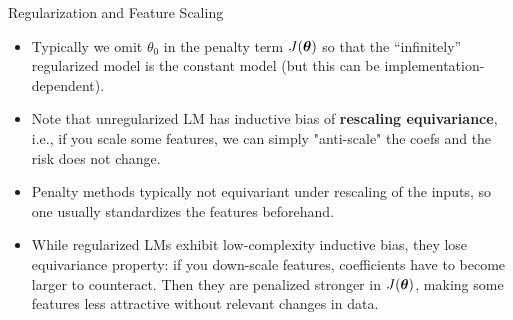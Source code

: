 \documentclass[11pt,compress,t,notes=noshow, xcolor=table]{beamer}
\begin{document}
\begin{vbframe}{Regularization and Feature Scaling}

  \begin{itemize}
    \item Typically we omit $\theta_0$ in the penalty term $J(\bm{\theta})$ so that the ``infinitely'' regularized model is the constant model (but this can be implementation-dependent).
    \item Note that unregularized LM has inductive bias of \textbf{rescaling equivariance}, i.e., if you scale some features, we can simply "anti-scale" the coefs and the risk does not change.
    \item Penalty methods typically not equivariant under rescaling of the inputs, so one usually standardizes the features beforehand.  
    \item While regularized LMs exhibit low-complexity inductive bias, they lose equivariance property: if you down-scale features, coefficients have to become larger to counteract. Then they are penalized stronger in $J(\bm{\theta})$, making some features less attractive without relevant changes in data.
      
  \end{itemize}

\framebreak



\end{vbframe}
\end{document}

